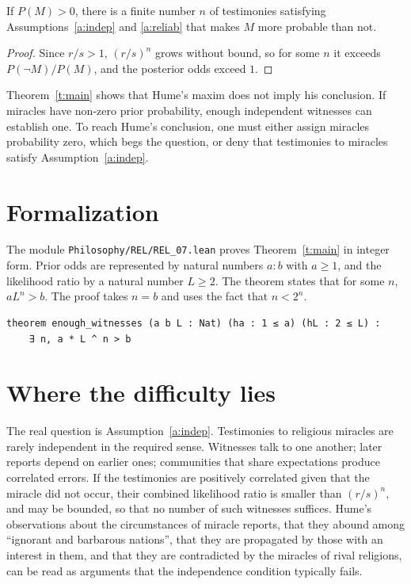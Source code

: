 \documentclass{situationist-preprint}
\begin{document}
\begin{theorem}\label{t:main}
If $P(M) > 0$, there is a finite number $n$ of testimonies satisfying Assumptions~\ref{a:indep} and \ref{a:reliab} that makes $M$ more probable than not.
\end{theorem}

\begin{proof}
Since $r/s > 1$, $(r/s)^n$ grows without bound, so for some $n$ it exceeds $P(\neg M)/P(M)$, and the posterior odds exceed $1$.
\end{proof}

Theorem~\ref{t:main} shows that Hume's maxim does not imply his conclusion. If miracles have non-zero prior probability, enough independent witnesses can establish one. To reach Hume's conclusion, one must either assign miracles probability zero, which begs the question, or deny that testimonies to miracles satisfy Assumption~\ref{a:indep}.

\section{Formalization}

The module \nolinkurl{Philosophy/REL/REL_07.lean} proves Theorem~\ref{t:main} in integer form. Prior odds are represented by natural numbers $a : b$ with $a \geq 1$, and the likelihood ratio by a natural number $L \geq 2$. The theorem states that for some $n$, $a L^n > b$. The proof takes $n = b$ and uses the fact that $n < 2^n$.

\begin{lstlisting}
theorem enough_witnesses (a b L : Nat) (ha : 1 ≤ a) (hL : 2 ≤ L) :
    ∃ n, a * L ^ n > b
\end{lstlisting}

\section{Where the difficulty lies}

The real question is Assumption~\ref{a:indep}. Testimonies to religious miracles are rarely independent in the required sense. Witnesses talk to one another; later reports depend on earlier ones; communities that share expectations produce correlated errors. If the testimonies are positively correlated given that the miracle did not occur, their combined likelihood ratio is smaller than $(r/s)^n$, and may be bounded, so that no number of such witnesses suffices. Hume's observations about the circumstances of miracle reports, that they abound among \enquote{ignorant and barbarous nations}, that they are propagated by those with an interest in them, and that they are contradicted by the miracles of rival religions, can be read as arguments that the independence condition typically fails.
\end{document}
